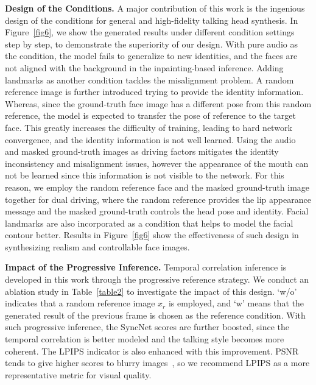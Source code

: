 \documentclass[10pt,twocolumn,letterpaper]{article}
\begin{document}
\textbf{Design of the Conditions.}
A major contribution of this work is the ingenious design of the conditions for general and high-fidelity talking head synthesis. In Figure~\ref{fig6}, we show the generated results under different condition settings step by step, to demonstrate the superiority of our design. With pure audio as the condition, the model fails to generalize to new identities, and the faces are not aligned with the background in the inpainting-based inference. Adding landmarks as another condition tackles the misalignment problem. A random reference image is further introduced trying to provide the identity information. Whereas, since the ground-truth face image has a different pose from this random reference, the model is expected to transfer the pose of reference to the target face. This greatly increases the difficulty of training, leading to hard network convergence, and the identity information is not well learned. Using the audio and masked ground-truth images as driving factors mitigates the identity inconsistency and misalignment issues, however the appearance of the mouth can not be learned since this information is not visible to the network. For this reason, we employ the random reference face and the masked ground-truth image together for dual driving, where the random reference provides the lip appearance message and the masked ground-truth controls the head pose and identity. Facial landmarks are also incorporated as a condition that helps to model the facial contour better. Results in Figure~\ref{fig6} show the effectiveness of such design in synthesizing realism and controllable face images.

\textbf{Impact of the Progressive Inference.}
Temporal correlation inference is developed in this work through the progressive reference strategy. We conduct an ablation study in  Table~\ref{table2} to investigate the impact of this design. `w/o' indicates that a random reference image $x_r$ is employed, and `w' means that the generated result of the previous frame is chosen as the reference condition. With such progressive inference, the SyncNet scores are further boosted, 
since the temporal correlation is better modeled and the talking style becomes more coherent. The LPIPS indicator is also enhanced with this improvement. PSNR tends to give higher scores to blurry images~\cite{zhang2018unreasonable},
so we recommend LPIPS as a more representative metric for visual quality.
\end{document}
